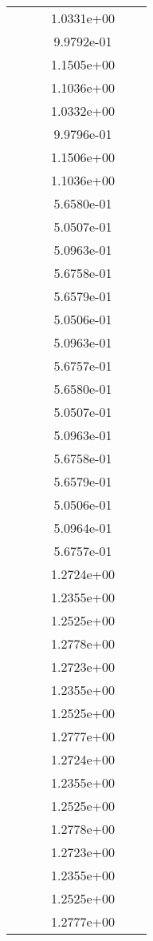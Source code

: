 \begin{xltabular}{\textwidth}{r|rS[table-format=1.3e+2]S[table-format=1.4e+2]S[table-format=1.4e+2]S[table-format=-1.5]}
&  &  & 1.0331e+00 & & \\
&  &  & 9.9792e-01 & & \\
&  &  & 1.1505e+00 & & \\
&  &  & 1.1036e+00 & & \\
&  &  & 1.0332e+00 & & \\
&  &  & 9.9796e-01 & & \\
&  &  & 1.1506e+00 & & \\
&  &  & 1.1036e+00 & & \\
&  &  & 5.6580e-01 & & \\
&  &  & 5.0507e-01 & & \\
&  &  & 5.0963e-01 & & \\
&  &  & 5.6758e-01 & & \\
&  &  & 5.6579e-01 & & \\
&  &  & 5.0506e-01 & & \\
&  &  & 5.0963e-01 & & \\
&  &  & 5.6757e-01 & & \\
&  &  & 5.6580e-01 & & \\
&  &  & 5.0507e-01 & & \\
&  &  & 5.0963e-01 & & \\
&  &  & 5.6758e-01 & & \\
&  &  & 5.6579e-01 & & \\
&  &  & 5.0506e-01 & & \\
&  &  & 5.0964e-01 & & \\
&  &  & 5.6757e-01 & & \\
&  &  & 1.2724e+00 & & \\
&  &  & 1.2355e+00 & & \\
&  &  & 1.2525e+00 & & \\
&  &  & 1.2778e+00 & & \\
&  &  & 1.2723e+00 & & \\
&  &  & 1.2355e+00 & & \\
&  &  & 1.2525e+00 & & \\
&  &  & 1.2777e+00 & & \\
&  &  & 1.2724e+00 & & \\
&  &  & 1.2355e+00 & & \\
&  &  & 1.2525e+00 & & \\
&  &  & 1.2778e+00 & & \\
&  &  & 1.2723e+00 & & \\
&  &  & 1.2355e+00 & & \\
&  &  & 1.2525e+00 & & \\
&  &  & 1.2777e+00 & & \\

\end{xltabular}
